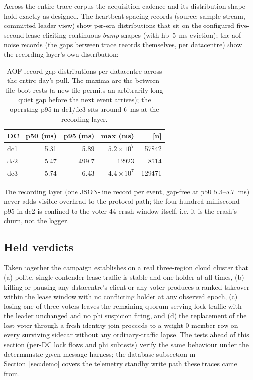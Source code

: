 \documentclass[10pt,journal,letterpaper]{IEEEtran}
\begin{document}
Across the entire trace corpus the acquisition cadence and its
distribution shape hold exactly as designed. The heartbeat-spacing
records (source: sample stream, committed leader view) show per-era
distributions that sit on the configured five-second lease eliciting
continuous \emph{bump} shapes (with hb~5~ms eviction); the aof-noise
records (the gaps between trace records themselves, per datacentre)
show the recording layer's own distribution:

\begin{table}[t]
\centering
\small
\begin{tabular}{lrrrr}
\toprule
DC & p50 (ms) & p95 (ms) & max (ms) & [n] \\
\midrule
dc1 & 5.31 & 5.89 & $5.2\times10^{7}$ & 57842 \\
dc2 & 5.47 & 499.7 & 12923 & 8614 \\
dc3 & 5.74 & 6.43 & $4.4\times10^{7}$ & 129471 \\
\bottomrule
\end{tabular}
\caption{AOF record-gap distributions per datacentre across the entire
day's pull. The maxima are the between-file boot rests (a new file
permits an arbitrarily long quiet gap before the next event arrives);
the operating p95 in dc1/dc3 sits around 6~ms at the recording layer.}
\label{tab:aofnoise}
\end{table}

The recording layer (one JSON-line record per event, gap-free at
p50 5.3--5.7~ms) never adds visible overhead to the protocol path; the
four-hundred-millisecond p95 in dc2 is confined to the
voter-44-crash window itself, i.e. it is the crash's churn, not the
logger.

\subsection{Held verdicts}

Taken together the campaign establishes on a real three-region cloud
cluster that (a) polite, single-contender lease traffic is stable and
one holder at all times, (b) killing or pausing any datacentre's client
or any voter produces a ranked takeover within the lease window with no
conflicting holder at any observed epoch, (c) losing one of three
voters leaves the remaining quorum serving lock traffic with the leader
unchanged and no phi suspicion firing, and (d) the replacement of the
lost voter through a fresh-identity join proceeds to a weight-0 member
row on every surviving sidecar without any ordinary-traffic lapse. The
tests ahead of this section (per-DC lock flows and phi subtests) verify
the same behaviour under the deterministic given-message harness; the
database subsection in Section~\ref{sec:demo} covers the telemetry
standby write path these traces came from.
\end{document}
